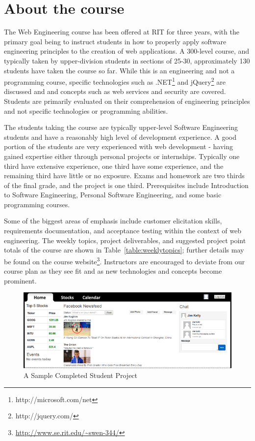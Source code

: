 \documentclass[conference]{IEEEtran}
\begin{document}
\section{About the course}
\label{sec: aboutcourse}

%


The Web Engineering course has been offered at RIT for three years, with the primary goal being to instruct students in how to properly apply software engineering principles to the creation of web applications. A 300-level course, and typically taken by upper-division students in sections of 25-30, approximately 130 students have taken the course so far. While this is an engineering and not a programming course, specific technologies such as .NET\footnote{http://microsoft.com/net} and jQuery\footnote{http://jquery.com/} are discussed and and concepts such as web services and security are covered. Students are primarily evaluated on their comprehension of engineering principles and not specific technologies or programming abilities.

The students taking the course are typically upper-level Software Engineering students and have a reasonably high level of development experience. A good portion of the students are very experienced with web development - having gained expertise either through personal projects or internships. Typically one third have extensive experience, one third have some experience, and the remaining third have little or no exposure. Exams and homework are two thirds of the final grade, and the project is one third. Prerequisites include Introduction to Software Engineering, Personal Software Engineering, and some basic programming courses.

Some of the biggest areas of emphasis include customer elicitation skills, requirements documentation, and acceptance testing within the context of web engineering.  The weekly topics, project deliverables, and suggested project point totals of the course are shown in Table~\ref{table:weeklytopics}; further details may be found on the course website\footnote{\url{http://www.se.rit.edu/~swen-344/}}. Instructors are encouraged to deviate from our course plan as they see fit and as new technologies and concepts become prominent.


\begin{figure}[ht!]
\centering
\includegraphics[width=1.0\textwidth]{images/R2b.png}
\caption{A Sample Completed Student Project}
\label{fig:website1}
\end{figure}
\end{document}

